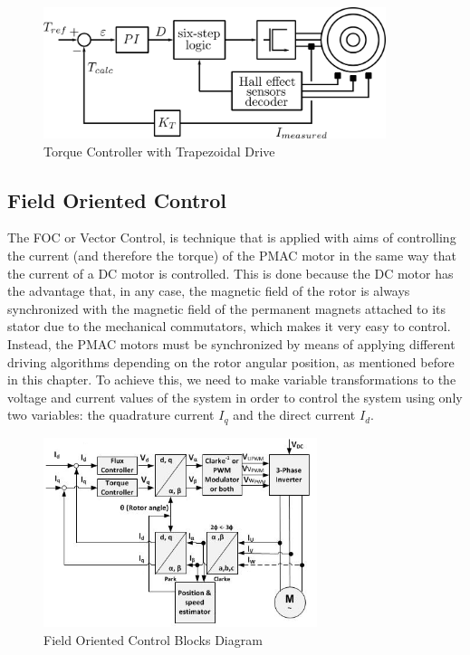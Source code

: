 \begin{figure}[htbp]
\centering
\includegraphics[width=10cm]{Images/torque_trapezoidal.png} 
\caption[Torque Controller with Trapezoidal Drive]{Torque Controller with Trapezoidal Drive}
\label{fig:torque_trapezoidal}
\end{figure}

\subsection{Field Oriented Control}

The \acf{FOC} or Vector Control, is technique that is applied with aims of controlling the current (and therefore the torque) of the \ac{PMAC} motor in the same way that the current of a \ac{DC} motor is controlled. This is done because the \ac{DC} motor has the advantage that, in any case, the magnetic field of the rotor is always synchronized with the magnetic field of the permanent magnets attached to its stator due to the mechanical commutators, which makes it very easy to control. Instead, the \ac{PMAC} motors must be synchronized by means of applying different driving algorithms depending on the rotor angular position, as mentioned before in this chapter. To achieve this, we need to make variable transformations to the voltage and current values of the system in order to control the system using only two variables: the quadrature current $I_{q}$ and the direct current $I_{d}$.

\begin{figure}[htbp]
\centering
\includegraphics[width=8cm]{Images/foc_current.png} 
\caption[Field Oriented Control Blocks Diagram]{Field Oriented Control Blocks Diagram}
\label{fig:foc_current}
\end{figure}

